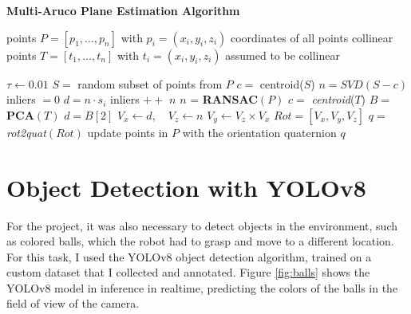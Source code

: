 \begin{algorithm}[H]
    \caption{\textbf{Multi-Aruco Plane Estimation Algorithm}}
    \label{alg:multi_aruco}
    \begin{algorithmic}[1]
    
    \Require points $P = \left[ p_1, \ldots, p_n \right]$ with $p_i = (x_i, y_i, z_i)$ coordinates of all points
    \Require collinear points $T = \left[t_1, \ldots, t_n \right]$ with $t_i = (x_i, y_i, z_i)$ assumed to be collinear
    
        \State $\tau \gets 0.01$ 
        \Repeat
            \State $S =$ random subset of points from $P$
            \State $c =$ centroid($S$) 
            \State $n = SVD(S - c)$  
            \State inliers $ = 0$ 
            \State $d = n \cdot s_i$ 
                 
                    \State inliers $++$
                \EndIf
            \EndFor
        \State \Return $n$ 
    \EndFunction
    \State
    \State $n$ = \textbf{RANSAC}$(P)$
    \State $c =$ \textit{centroid}($T$) 
    \State $B = $ \textbf{PCA}$(T)$ 
    \State $d = B[2]$ 
    \State $V_x \gets d, \quad V_z \gets n$
    \State $V_y \gets V_z \times V_x$ 
    \State $Rot = \left[V_x, V_y, V_z \right]$ 
    \State $q = $ \textit{rot2quat}$(Rot)$ 
    \State update points in $P$ with the orientation quaternion $q$
    \end{algorithmic}
\end{algorithm}

\section{Object Detection with YOLOv8}

For the project, it was also necessary to detect objects in the environment, such as colored balls, which the robot
had to grasp and move to a different location. For this task, I used the YOLOv8 object detection algorithm, trained
on a custom dataset that I collected and annotated. Figure \ref{fig:balls} shows the YOLOv8 model in inference
in realtime, predicting the colors of the balls in the field of view of the camera.

